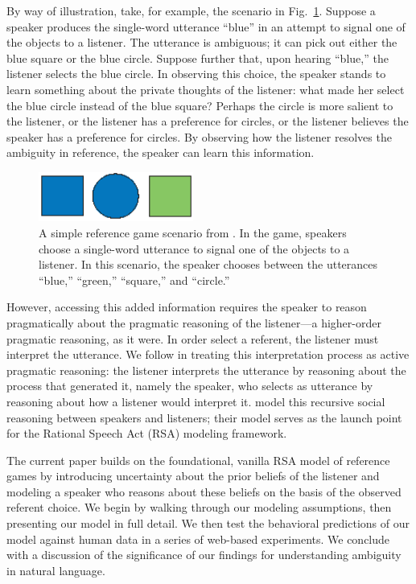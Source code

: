 \documentclass[10pt,a4paper]{article}
\begin{document}
By way of illustration, take, for example, the scenario in Fig.~\ref{FG-ref-game}. Suppose a speaker produces the single-word utterance ``blue'' in an attempt to signal one of the objects to a listener. The utterance is ambiguous; it can pick out either the blue square or the blue circle. Suppose further that, upon hearing ``blue,'' the listener selects the blue circle. In observing this choice, the speaker stands to learn something about the private thoughts of the listener: what made her select the blue circle instead of the blue square? Perhaps the circle is more salient to the listener, or the listener has a preference for circles, or the listener believes the speaker has a preference for circles. By observing how the listener resolves the ambiguity in reference, the speaker can learn this information. 

\begin{figure}
	\centering
	\includegraphics[width=2in]{images/rsascene.eps}
	\caption{A simple reference game scenario from . In the game, speakers choose a single-word utterance to signal one of the objects to a listener. In this scenario, the speaker chooses between the utterances ``blue,'' ``green,'' ``square,'' and ``circle.''}\label{FG-ref-game}
\end{figure}

However, accessing this added information requires the speaker to reason pragmatically about the pragmatic reasoning of the listener---a higher-order pragmatic reasoning, as it were. In order select a referent, the listener must interpret the utterance. We follow  in treating this interpretation process as active pragmatic reasoning: the listener interprets the utterance by reasoning about the process that generated it, namely the speaker, who selects as utterance by reasoning about how a listener would interpret it. \citeauthor{frankgoodman2012} model this recursive social reasoning between speakers and listeners; their model serves as the launch point for the Rational Speech Act (RSA) modeling framework.

The current paper builds on the foundational, vanilla RSA model of reference games by introducing uncertainty about the prior beliefs of the listener and modeling a speaker who reasons about these beliefs on the basis of the observed referent choice. We begin by walking through our modeling assumptions, then presenting our model in full detail. We then test the behavioral predictions of our model against human data in a series of web-based experiments. We conclude with a discussion of the significance of our findings for understanding ambiguity in natural language.
\end{document}
